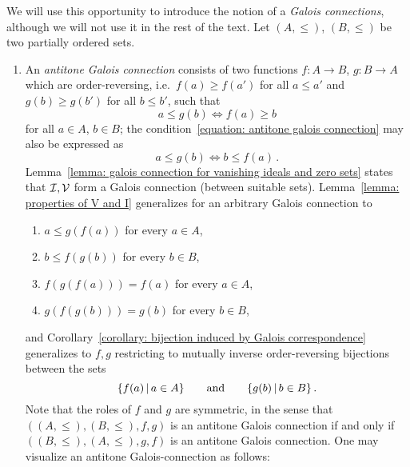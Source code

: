 \begin{remark}
  We will use this opportunity to introduce the notion of a \emph{Galois connections}, although we will not use it in the rest of the text.
  Let $(A,\leq)$, $(B, \leq)$ be two partially ordered sets.
  \begin{enumerate}
    \item
      An \emph{antitone Galois connection} consists of two functions $f \colon A \to B$, $g \colon B \to A$ which are order-reversing, i.e.\ $f(a) \geq f(a')$ for all $a \leq a'$ and $g(b) \geq g(b')$ for all $b \leq b'$, such that
      \begin{equation}
        \label{equation: antitone galois connection}
              a \leq g(b)
        \iff  f(a) \geq b
      \end{equation}
      for all $a \in A$, $b \in B$;
      the condition~\eqref{equation: antitone galois connection} may also be expressed as
      \[
              a \leq g(b)
        \iff  b \leq f(a) \,.
      \]
      Lemma~\ref{lemma: galois connection for vanishing ideals and zero sets} states that $\mathcal{I}, \mathcal{V}$ form a Galois connection (between suitable sets).
      Lemma~\ref{lemma: properties of V and I} generalizes for an arbitrary Galois connection to
      \begin{enumerate}[label = \alph*')]
        \item
          \label{enumerate: gf is monotone}
          $a \leq g(f(a))$ for every $a \in A$,
        \item
          \label{enumerate: fg is monotone}
          $b \leq f(g(b))$ for every $b \in B$,
        \item
          \label{enumerate: fgf = f}
          $f(g(f(a))) = f(a)$ for every $a \in A$,
        \item
          \label{enumerate: gfg = g}
          $g(f(g(b))) = g(b)$ for every $b \in B$,
      \end{enumerate}
      and Corollary~\ref{corollary: bijection induced by Galois correspondence} generalizes to $f, g$ restricting to mutually inverse order-re\-ver\-sing bijections between the sets
      \[
        \{ f(a) \suchthat a \in A \}
        \qquad\text{and}\qquad
        \{ g(b) \suchthat b \in B \} \,.
      \]
      Note that the roles of $f$ and $g$ are symmetric, in the sense that $((A, \leq), (B, \leq), f, g)$ is an antitone Galois connection if and only if $((B, \leq), (A, \leq), g, f)$ is an antitone Galois connection.
      One may visualize an antitone Galois-connection as follows:

\end{enumerate}
\end{remark}
